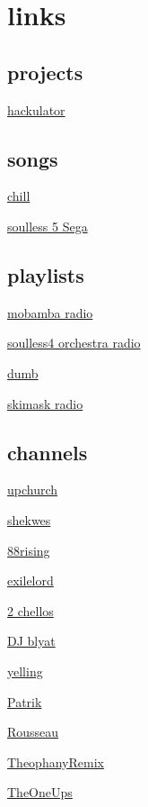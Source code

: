 \section{links}

\subsection{projects}
\noindent\href{https://hackaday.io/project/161183/gallery\#bbe45d161b7a8943d18805b74f3de061}{hackulator}

\subsection{songs}
\noindent\href{https://www.youtube.com/watch?v=GdzrrWA8e7A}{chill}

\noindent\href{https://www.youtube.com/watch?v=CNVZV9rcHmg}{soulless 5 Sega}

\subsection{playlists}
\noindent\href{https://www.youtube.com/watch?v=VWoIpDVkOH0\&list=RDVWoIpDVkOH0\&start\_radio=1}{mobamba radio} 

\noindent\href{https://www.youtube.com/watch?v=Cw9U7Xi2hd0\&start\_radio=1\&list=RDMMCw9U7Xi2hd0}{soulless4 orchestra radio}

\noindent\href{https://www.youtube.com/watch?v=5rzjD2ImpCM\&list=RD5rzjD2ImpCM}{dumb}

\noindent\href{https://www.youtube.com/watch?v=w7r2qTrT9vM\&list=RDEM8lWaLd8vXH433IgsZ43qcw}{skimask radio} 

\subsection{channels}
\noindent\href{https://www.youtube.com/channel/UCaQVx6CxQNmQktFQ-\_jxmzQ}{upchurch} 

\noindent\href{https://www.youtube.com/channel/UCDwRsna1wodg4u-pcFYFtWw}{shekwes}

\noindent\href{https://www.youtube.com/channel/UCZW5lIUz93q\_aZIkJPAC0IQ}{88rising} 

\noindent\href{https://www.youtube.com/channel/UCfNRZxjhslYzbbsM-0ha4BA}{exilelord}

\noindent\href{https://www.youtube.com/channel/UCyjuFsbclXyntSRMBAILzbw}{2 chellos}

\noindent\href{https://www.youtube.com/channel/UCnWnuHHjG-i\_\_QxuoZgjBgIg}{DJ blyat}

\noindent\href{https://www.youtube.com/channel/UC4Hp6i7ZQ9ULKBtVai6ayaQ}{yelling}

\noindent\href{https://www.youtube.com/channel/UCs7O9sOUQiBGBxaaAguIwig}{Patrik}

\noindent\href{https://www.youtube.com/channel/UCPZUQqtVDmcjm4NY5FkzqLA}{Rousseau} 

\noindent\href{https://www.youtube.com/user/TheophanyRemix}{TheophanyRemix}

\noindent\href{https://www.youtube.com/user/TheOneUps}{TheOneUps} 
